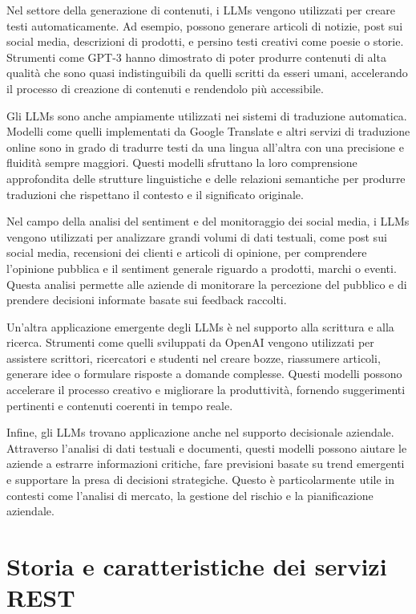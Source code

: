 \documentclass[a4paper,twoside,12pt]{toptesi}
\begin{document}
Nel settore della generazione di contenuti, i LLMs vengono utilizzati per creare testi automaticamente. Ad esempio, possono generare articoli di notizie, post sui social media, descrizioni di prodotti, e persino testi creativi come poesie o storie. Strumenti come GPT-3 hanno dimostrato di poter produrre contenuti di alta qualità che sono quasi indistinguibili da quelli scritti da esseri umani, accelerando il processo di creazione di contenuti e rendendolo più accessibile.

Gli LLMs sono anche ampiamente utilizzati nei sistemi di traduzione automatica. Modelli come quelli implementati da Google Translate e altri servizi di traduzione online sono in grado di tradurre testi da una lingua all'altra con una precisione e fluidità sempre maggiori. Questi modelli sfruttano la loro comprensione approfondita delle strutture linguistiche e delle relazioni semantiche per produrre traduzioni che rispettano il contesto e il significato originale.

Nel campo della analisi del sentiment e del monitoraggio dei social media, i LLMs vengono utilizzati per analizzare grandi volumi di dati testuali, come post sui social media, recensioni dei clienti e articoli di opinione, per comprendere l'opinione pubblica e il sentiment generale riguardo a prodotti, marchi o eventi. Questa analisi permette alle aziende di monitorare la percezione del pubblico e di prendere decisioni informate basate sui feedback raccolti.

Un'altra applicazione emergente degli LLMs è nel supporto alla scrittura e alla ricerca. Strumenti come quelli sviluppati da OpenAI vengono utilizzati per assistere scrittori, ricercatori e studenti nel creare bozze, riassumere articoli, generare idee o formulare risposte a domande complesse. Questi modelli possono accelerare il processo creativo e migliorare la produttività, fornendo suggerimenti pertinenti e contenuti coerenti in tempo reale.

Infine, gli LLMs trovano applicazione anche nel supporto decisionale aziendale. Attraverso l'analisi di dati testuali e documenti, questi modelli possono aiutare le aziende a estrarre informazioni critiche, fare previsioni basate su trend emergenti e supportare la presa di decisioni strategiche. Questo è particolarmente utile in contesti come l'analisi di mercato, la gestione del rischio e la pianificazione aziendale.


\section{Storia e caratteristiche dei servizi REST}
\end{document}
